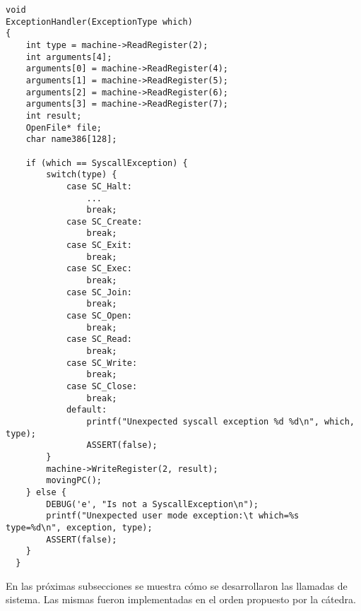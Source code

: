 \begin{lstlisting}[style=C]
void
ExceptionHandler(ExceptionType which)
{
    int type = machine->ReadRegister(2);
    int arguments[4];
    arguments[0] = machine->ReadRegister(4);
    arguments[1] = machine->ReadRegister(5);
    arguments[2] = machine->ReadRegister(6);
    arguments[3] = machine->ReadRegister(7);
    int result;
    OpenFile* file;
    char name386[128];

    if (which == SyscallException) {
    	switch(type) {
            case SC_Halt:
                ...
                break;
            case SC_Create:
                break;
            case SC_Exit:
                break;
            case SC_Exec:
                break;
            case SC_Join:
                break;
            case SC_Open:
                break;
            case SC_Read:
                break;
            case SC_Write:
                break;
            case SC_Close:
                break;
            default: 
                printf("Unexpected syscall exception %d %d\n", which, type);
                ASSERT(false);
    	}
        machine->WriteRegister(2, result);
    	movingPC();
    } else {
        DEBUG('e', "Is not a SyscallException\n");
        printf("Unexpected user mode exception:\t which=%s  type=%d\n", exception, type);
        ASSERT(false);
    }
  }
\end{lstlisting}
En las próximas subsecciones se muestra cómo se desarrollaron las llamadas de sistema. Las mismas fueron implementadas en el orden propuesto por la cátedra.
